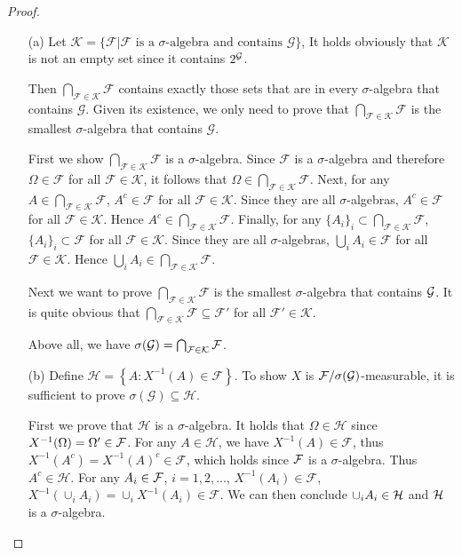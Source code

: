 \begin{proof}
\begin{enumerate}
    \item[(a)] Let $\mathcal{K} = \{\mathcal{F} | \mathcal{F} \mbox{ is a }\sigma\mbox{-algebra and contains } \mathcal{G}\}$, It holds obviously that $\mathcal{K}$ is not an empty set since it contains $2^{\mathcal{G}}$.

    Then $\bigcap_{\mathcal{F} \in \mathcal{K}}\mathcal{F}$ contains exactly those sets that are in every $\sigma$-algebra that contains $\mathcal{G}$. Given its existence, we only need to prove that $\bigcap_{\mathcal{F} \in \mathcal{K}}\mathcal{F}$ is the smallest $\sigma$-algebra that contains $\mathcal{G}$.

    First we show $\bigcap_{\mathcal{F} \in \mathcal{K}}\mathcal{F}$ is a $\sigma$-algebra. Since $\mathcal{F}$ is a $\sigma$-algebra and therefore $\Omega \in \mathcal{F}$ for all $\mathcal{F} \in \mathcal{K}$, it follows that $\Omega \in \bigcap_{\mathcal{F} \in \mathcal{K}}\mathcal{F}$. Next, for any $A \in \bigcap_{\mathcal{F} \in \mathcal{K}}\mathcal{F}$, $A^c \in \mathcal{F}$ for all $\mathcal{F} \in \mathcal{K}$. Since they are all $\sigma$-algebras, $A^c \in \mathcal{F}$ for all $\mathcal{F} \in \mathcal{K}$. Hence $A^c \in \bigcap_{\mathcal{F} \in \mathcal{K}}\mathcal{F}$. Finally, for any $\{A_i\}_i \subset \bigcap_{\mathcal{F} \in \mathcal{K}}\mathcal{F}$, $\{A_i\}_i \subset \mathcal{F}$ for all $\mathcal{F} \in \mathcal{K}$. Since they are all $\sigma$-algebras, $\bigcup_i A_i \in \mathcal{F}$ for all $\mathcal{F} \in \mathcal{K}$. Hence $\bigcup_i A_i \in \bigcap_{\mathcal{F} \in \mathcal{K}}\mathcal{F}$. 

    Next we want to prove $\bigcap_{\mathcal{F} \in \mathcal{K}}\mathcal{F}$ is the smallest $\sigma$-algebra that contains $\mathcal{G}$. It is quite obvious that $\bigcap_{\mathcal{F} \in \mathcal{K}}\mathcal{F} \subseteq \mathcal{F}'$ for all $\mathcal{F}' \in \mathcal{K}$. 

    Above all, we have $\sigma(\mathcal{G})=\bigcap_{\mathcal{F} \in \mathcal{K}}\mathcal{F}$.

    \item[(b)] Define $\mathcal{H}=\left\{A: X^{-1}(A) \in \mathcal{F}\right\}$.
    To show $X$ is $\mathcal{F}/\sigma(\mathcal{G})$-measurable, it is sufficient to prove $\sigma(\mathcal{G}) \subseteq \mathcal{H}$.

    First we prove that $\mathcal{H}$ is a $\sigma$-algebra.
    It holds that $\Omega \in \mathcal{H}$ since $X^{-1}(\Omega) = \Omega' \in \mathcal{F}$.
    For any $A \in \mathcal{H}$, we have $X^{-1}(A) \in \mathcal{F}$, thus $X^{-1}(A^c) = X^{-1}(A)^c \in \mathcal{F}$, which holds since $\mathcal{F}$ is a $\sigma$-algebra. Thus $A^c \in \mathcal{H}$. For any $A_i \in \mathcal{F}$, $i=1,2,...$, $X^{-1}(A_i) \in \mathcal{F}$, $X^{-1}(\cup_i A_i) = \cup_i X^{-1}(A_i) \in \mathcal{F}$. We can then conclude $\cup_i A_i \in \mathcal{H}$ and $\mathcal{H}$ is a $\sigma$-algebra.



\end{enumerate}
\end{proof}
